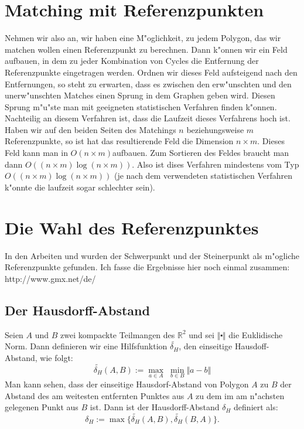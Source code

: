 \documentclass[a4paper,11pt]{scrreprt}
\begin{document}
\section{Matching mit Referenzpunkten}

Nehmen wir also an, wir haben eine M"oglichkeit, zu jedem Polygon, das wir matchen wollen einen Referenzpunkt zu berechnen. Dann k"onnen wir ein Feld aufbauen, in dem zu jeder Kombination von Cycles die Entfernung der Referenzpunkte eingetragen werden. Ordnen wir dieses Feld aufsteigend nach den Entfernungen, so steht zu erwarten, dass es zwischen den erw"unschten und den unerw"unschten Matches einen Sprung in dem Graphen geben wird. Diesen Sprung m"u"ste man mit geeigneten statistischen Verfahren finden k"onnen. Nachteilig an diesem Verfahren ist, dass die Laufzeit dieses Verfahrens hoch ist. Haben wir auf den beiden Seiten des Matchings $n$ beziehungsweise $m$ Referenzpunkte, so ist hat das resultierende Feld die Dimension $n\times m$. Dieses Feld kann man in $O(n\times m)$aufbauen. Zum Sortieren des Feldes braucht man dann $O((n\times m)\log(n\times m))$. Also ist dises Verfahren mindestens vom Typ $O((n\times m)\log(n\times m))$ (je nach dem verwendeten statistischen Verfahren k"onnte die laufzeit sogar schlechter sein).

\section{Die Wahl des Referenzpunktes}
In den Arbeiten \cite{AAR} und  \cite{AFRW} wurden der Schwerpunkt und der Steinerpunkt als m"ogliche Referenzpunkte gefunden. Ich fasse die Ergebnisse hier noch einmal zusammen:
http://www.gmx.net/de/
\subsection{Der Hausdorff-Abstand}

Seien $A$ und $B$ zwei kompackte Teilmangen des $\mathbb{R}^2$ und sei $\Vert\centerdot\Vert$ die Euklidische Norm.
Dann definieren wir eine Hilfsfunktion $ \widetilde{\delta_H}  $, den einseitige Hausdoff-Abstand, wie folgt:
$$ \widetilde{\delta_H}(A,B):=\max_{a\in A} \;\min_{b\in B} \Vert a-b \Vert$$
Man kann sehen, dass der einseitige Hausdorf-Abstand von Polygon $A$ zu $B$ der Abstand des am weitesten entfernten Punktes aus $A$ zu dem im am n"achsten gelegenen Punkt aus $B$ ist. Dann ist der Hausdorff-Abstand $\delta_H$ definiert als:
$$\delta_H:=\max\{\widetilde{\delta_H}(A,B),\widetilde{\delta_H}(B,A)\}.$$
\end{document}
